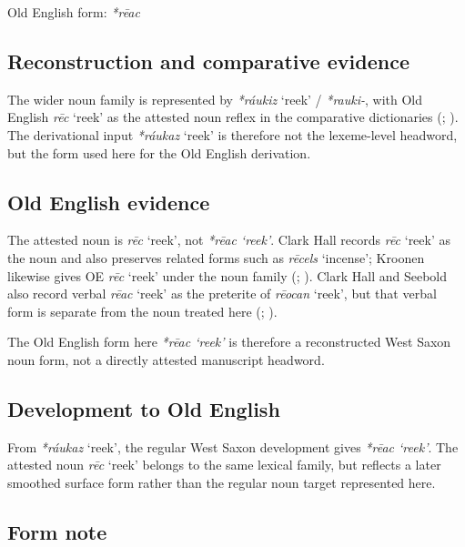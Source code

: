 \documentclass[
  british,
  a4paper,
  openany]{book}
\providecommand{\Recon}[1]{\emph{*#1}}
{\catcode`→=\active \global\def→{\ensuremath{\rightarrow}}}
\providecommand{\Recon}[1]{\emph{*#1}}
{\catcode`→=\active \global\def→{\ensuremath{\rightarrow}}}
\begin{document}
Old English form: \emph{*rēac}

\subsection{Reconstruction and comparative
evidence}\label{reconstruction-and-comparative-evidence-137}

The wider noun family is represented by {\Recon{ráukiz} `reek'} /
{\emph{*rauki-}}, with Old English {\emph{rēc}} `reek' as the attested
noun reflex in the comparative dictionaries
(;
). The derivational input
{\Recon{ráukaz} `reek'} is therefore not the lexeme-level headword, but
the form used here for the Old English derivation.

\subsection{Old English evidence}\label{old-english-evidence-137}

The attested noun is {\emph{rēc}} `reek', not {\emph{\Recon{rēac}
`reek'}}. Clark Hall records {\emph{rēc}} `reek' as the noun and also
preserves related forms such as {\emph{rēcels}} `incense'; Kroonen
likewise gives OE {\emph{rēc}} `reek' under the noun family
(;
). Clark Hall and Seebold
also record verbal {\emph{rēac}} `reek' as the preterite of
{\emph{rēocan}} `reek', but that verbal form is separate from the noun
treated here (;
).

The Old English form here {\emph{\Recon{rēac} `reek'}} is therefore a
reconstructed West Saxon noun form, not a directly attested manuscript
headword.

\subsection{Development to Old
English}\label{development-to-old-english-137}

From {\Recon{ráukaz} `reek'}, the regular West Saxon development gives
{\emph{\Recon{rēac} `reek'}}. The attested noun {\emph{rēc}} `reek'
belongs to the same lexical family, but reflects a later smoothed
surface form rather than the regular noun target represented here.

\subsection{Form note}\label{form-note-28}
\end{document}
